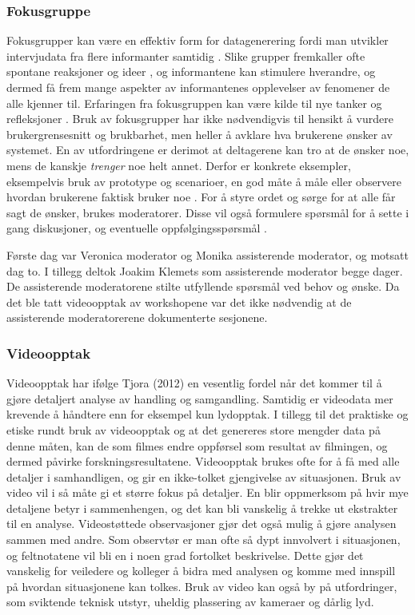 \subsubsection{Fokusgruppe}
Fokusgrupper kan være en effektiv form for datagenerering fordi man utvikler intervjudata fra flere informanter samtidig \cite{Tjora}. Slike grupper fremkaller ofte spontane reaksjoner og ideer \cite{Nielsen97}, og informantene kan stimulere hverandre, og dermed få frem mange aspekter av informantenes opplevelser av fenomener de alle kjenner til. Erfaringen fra fokusgruppen kan være kilde til nye tanker og refleksjoner \cite{Tjora}. Bruk av fokusgrupper har ikke nødvendigvis til hensikt å vurdere brukergrensesnitt og brukbarhet, men heller å avklare hva brukerene ønsker av systemet. En av utfordringene er derimot at deltagerene kan tro at de ønsker noe, mens de kanskje \emph{trenger} noe helt annet. Derfor er konkrete eksempler, eksempelvis bruk av prototype og scenarioer, en god måte å måle eller observere hvordan brukerene faktisk bruker noe \cite{Nielsen97}.
For å styre ordet og sørge for at alle får sagt de ønsker, brukes moderatorer. Disse vil også formulere spørsmål for å sette i gang diskusjoner, og eventuelle oppfølgingsspørsmål \cite{Tjora}. 

\noindent
Første dag var Veronica moderator og Monika assisterende moderator, og motsatt dag to. I tillegg deltok Joakim Klemets som assisterende moderator begge dager. De assisterende moderatorene stilte utfyllende spørsmål ved behov og ønske. Da det ble tatt videoopptak av workshopene var det ikke nødvendig at de assisterende moderatorerene dokumenterte sesjonene. 

\subsubsection{Videoopptak}
Videoopptak har ifølge Tjora (2012) en vesentlig fordel når det kommer til å gjøre detaljert analyse av handling og samgandling. Samtidig er videodata mer krevende å håndtere enn for eksempel kun lydopptak. I tillegg til det praktiske og etiske rundt bruk av videoopptak og at det genereres store mengder data på denne måten, kan de som filmes endre oppførsel som resultat av filmingen, og dermed påvirke forskningsresultatene. Videoopptak brukes ofte for å få med alle detaljer i samhandligen, og gir en ikke-tolket gjengivelse av situasjonen. Bruk av video vil i så måte gi et større fokus på detaljer. En blir oppmerksom på hvir mye detaljene betyr i sammenhengen, og det kan bli vanskelig å trekke ut ekstrakter til en analyse. 
Videostøttede observasjoner gjør det også mulig å gjøre analysen sammen med andre. Som observtør er man ofte så dypt innvolvert i situasjonen, og feltnotatene vil bli en i noen grad fortolket beskrivelse. Dette gjør det vanskelig for veiledere og kolleger å bidra med analysen og komme med innspill på hvordan situasjonene kan tolkes. 
Bruk av video kan også by på utfordringer, som sviktende teknisk utstyr, uheldig plassering av kameraer og dårlig lyd.

